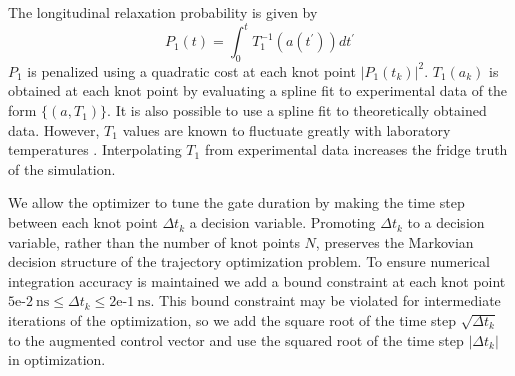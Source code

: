 The longitudinal relaxation probability is given by
\begin{equation}
  P_{1}(t) = \int_{0}^{t} T_{1}^{-1}(a(t^{\prime})) dt^{\prime}
\end{equation}
$P_{1}$ is penalized using a quadratic cost at each knot point
${\lvert P_{1}(t_{k}) \rvert}^{2}$.
$T_{1}(a_{k})$ is obtained at each knot point by evaluating
a spline fit to experimental data of the form $\{(a, T_{1})\}$.
It is also possible to use a spline fit to theoretically obtained data.
However, $T_{1}$ values are known to fluctuate greatly
with laboratory temperatures \cite{klimov2018fluctuations}.
Interpolating $T_{1}$ from experimental data
increases the fridge truth of the simulation.

We allow the optimizer to tune the gate duration by
making the time step between each knot point $\Delta t_{k}$
a decision variable. Promoting $\Delta t_{k}$ to a decision variable, rather
than the number of knot points $N$, preserves the
Markovian decision structure of the trajectory
optimization problem. To ensure numerical
integration accuracy is maintained we add a bound
constraint at each knot point
$5\textrm{e-}2 \ \textrm{ns} \le
\Delta t_{k} \le 2\textrm{e-}1 \ \textrm{ns}$.
This bound constraint may be
violated for intermediate iterations of the optimization,
so we add the square root of the time step $\sqrt{\Delta t_{k}}$
to the augmented control vector and use the squared root
of the time step $\lvert \Delta t_{k} \rvert$ in optimization.

